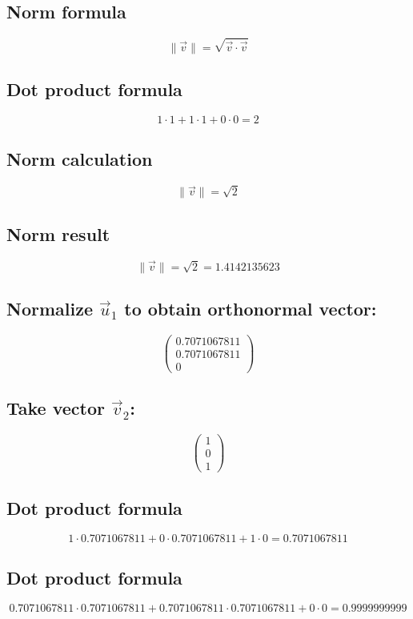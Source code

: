 \documentclass{article}
\begin{document}
\subsection*{ \vspace{1em} Norm formula}
\[
\|\vec{v}\| = \sqrt{\vec{v} \cdot \vec{v}}
\]
\subsection*{ \vspace{1em} Dot product formula}
\[
1 \cdot 1 + 1 \cdot 1 + 0 \cdot 0 = 2
\]
\subsection*{ \vspace{1em} Norm calculation}
\[
\|\vec{v}\| = \sqrt{2}
\]
\subsection*{ \vspace{1em} Norm result}
\[
\|\vec{v}\| = \sqrt{2} = 1.4142135623
\]
\subsection*{ \vspace{1em} Normalize \(\vec{u}_{1}\) to obtain orthonormal vector:}
\[
\begin{pmatrix}0.7071067811 \\ 0.7071067811 \\ 0\end{pmatrix}
\]
\subsection*{ \vspace{1em} Take vector \(\vec{v}_{2}\):}
\[
\begin{pmatrix}1 \\ 0 \\ 1\end{pmatrix}
\]
\subsection*{ \vspace{1em} Dot product formula}
\[
1 \cdot 0.7071067811 + 0 \cdot 0.7071067811 + 1 \cdot 0 = 0.7071067811
\]
\subsection*{ \vspace{1em} Dot product formula}
\[
0.7071067811 \cdot 0.7071067811 + 0.7071067811 \cdot 0.7071067811 + 0 \cdot 0 = 0.9999999999
\]
\end{document}
